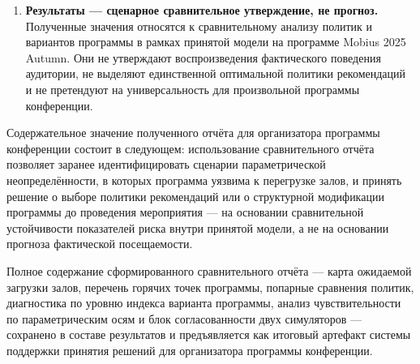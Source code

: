 \begin{enumerate}
\item \textbf{Результаты --- сценарное сравнительное утверждение, не прогноз.} Полученные значения относятся к сравнительному анализу политик и вариантов программы в рамках принятой модели на программе Mobius 2025 Autumn. Они не утверждают воспроизведения фактического поведения аудитории, не выделяют единственной оптимальной политики рекомендаций и не претендуют на универсальность для произвольной программы конференции.
\end{enumerate}

Содержательное значение полученного отчёта для организатора программы конференции состоит в следующем: использование сравнительного отчёта позволяет заранее идентифицировать сценарии параметрической неопределённости, в которых программа уязвима к перегрузке залов, и принять решение о выборе политики рекомендаций или о структурной модификации программы до проведения мероприятия --- на основании сравнительной устойчивости показателей риска внутри принятой модели, а не на основании прогноза фактической посещаемости.

Полное содержание сформированного сравнительного отчёта --- карта ожидаемой загрузки залов, перечень горячих точек программы, попарные сравнения политик, диагностика по уровню индекса варианта программы, анализ чувствительности по параметрическим осям и блок согласованности двух симуляторов --- сохранено в составе результатов и предъявляется как итоговый артефакт системы поддержки принятия решений для организатора программы конференции.
